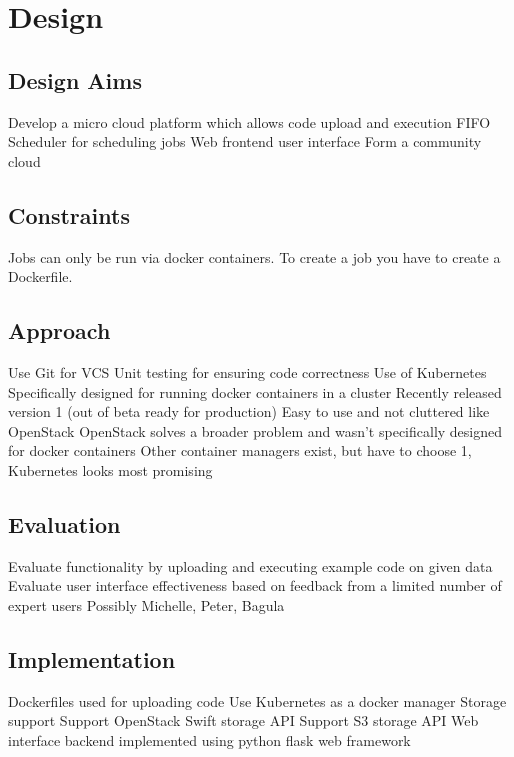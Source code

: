 \documentclass{sig-alternate-05-2015}
\begin{document}
\section{Design}
\subsection{Design Aims}
Develop a micro cloud platform which allows code upload and execution
FIFO Scheduler for scheduling jobs
Web frontend user interface
Form a community cloud
\subsection{Constraints}
Jobs can only be run via docker containers. To create a job you have to create a Dockerfile.
\subsection{Approach}
Use Git for VCS
Unit testing for ensuring code correctness
Use of Kubernetes
Specifically designed for running docker containers in a cluster
Recently released version 1 (out of beta ready for production)
Easy to use and not cluttered like OpenStack
OpenStack solves a broader problem and wasn’t specifically designed for docker containers
Other container managers exist, but have to choose 1, Kubernetes looks most promising
\subsection{Evaluation}
Evaluate functionality by uploading and executing example code on given data
Evaluate user interface effectiveness based on feedback from a limited number of expert users
Possibly Michelle, Peter, Bagula

\subsection{Implementation}
Dockerfiles used for uploading code
Use Kubernetes as a docker manager
Storage support
Support OpenStack Swift storage API
Support S3 storage API
Web interface
backend implemented using python flask web framework


 
\end{document}
